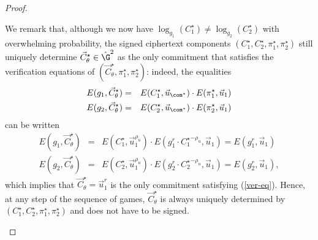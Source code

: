 \begin{proof}
\begin{description}
    We remark that, although we now have  
    $\log_{g_1}(C_1^\star) \neq \log_{g_2}(C_2^\star)$ with overwhelming probability, the signed ciphertext components $(C_1^\star,C_2^\star,\pi_1^\star,\pi_2^\star)$ 
    still uniquely determine $\vec{C}_{\theta}^\star \in \hat{\G}^2$ as the only commitment that satisfies the verification equations of 
    $(\vec{C}_{\theta}^\star,\pi_1^\star,\pi_2^\star)$:
    indeed, the equalities 
    \begin{eqnarray*}
      E(g_1,\vec{C}_\theta^\star) &=& E(C_1^\star, \vec{u}_{\com^\star}) \cdot E(\pi_1^\star ,\vec{u}_1)  \\ 
      E(g_2,\vec{C}_\theta^\star) &=& E(C_2^\star, \vec{u}_{\com^\star}) \cdot E(\pi_2^\star ,\vec{u}_1) 
    \end{eqnarray*} 
    can be written 
    \begin{eqnarray*}
      E(g_1,\vec{C}_\theta^\star) &=& E(C_1^\star , \vec{u}_1^{\rho_u} ) 
      \cdot E(  g_1^{r} \cdot {C_1^\star }^{-\rho_u} , \vec{u}_1)  = E(g_1^r,\vec{u}_1)  \\
      E(g_2,\vec{C}_\theta^\star) &=& E(C_2^\star , \vec{u}_1^{\rho_u} ) 
      \cdot E(  g_2^{r} \cdot {C_2^\star }^{-\rho_u} , \vec{u}_1) =E(g_2^r,\vec{u}_1),
    \end{eqnarray*}
    which implies that $\vec{C}_{\theta}^\star = \vec{u}_1^r$ is the only commitment satisfying (\ref{ver-eq}). Hence, at any step of the sequence of 
    games, $\vec{C}_\theta^\star$ 
    is always uniquely determined by $(C_1^\star,C_2^\star,\pi_1^\star,\pi_2^\star)$ and does not have to be signed. 
    \smallskip \smallskip

    

  \end{description}


\end{proof}
